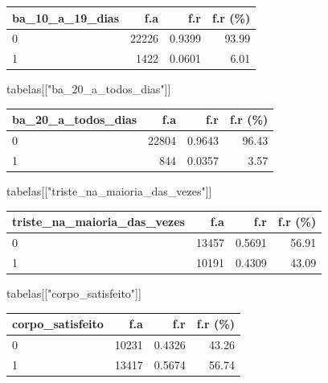 \documentclass[
]{article}
\newenvironment{Shaded}{\begin{snugshade}}{\end{snugshade}}
\newcommand{\NormalTok}[1]{\textcolor[rgb]{0.00,0.23,0.31}{#1}}
\newcommand{\StringTok}[1]{\textcolor[rgb]{0.13,0.47,0.30}{#1}}
\begin{document}
\begin{longtable}[]{@{}lrrr@{}}
\toprule()
ba\_10\_a\_19\_dias & f.a & f.r & f.r (\%) \\
\midrule()
\endhead
0 & 22226 & 0.9399 & 93.99 \\
1 & 1422 & 0.0601 & 6.01 \\
\bottomrule()
\end{longtable}

\begin{Shaded}
\begin{Highlighting}[]
\NormalTok{tabelas[[}\StringTok{"ba\_20\_a\_todos\_dias"}\NormalTok{]]}
\end{Highlighting}
\end{Shaded}

\begin{longtable}[]{@{}lrrr@{}}
\toprule()
ba\_20\_a\_todos\_dias & f.a & f.r & f.r (\%) \\
\midrule()
\endhead
0 & 22804 & 0.9643 & 96.43 \\
1 & 844 & 0.0357 & 3.57 \\
\bottomrule()
\end{longtable}

\begin{Shaded}
\begin{Highlighting}[]
\NormalTok{tabelas[[}\StringTok{"triste\_na\_maioria\_das\_vezes"}\NormalTok{]]}
\end{Highlighting}
\end{Shaded}

\begin{longtable}[]{@{}lrrr@{}}
\toprule()
triste\_na\_maioria\_das\_vezes & f.a & f.r & f.r (\%) \\
\midrule()
\endhead
0 & 13457 & 0.5691 & 56.91 \\
1 & 10191 & 0.4309 & 43.09 \\
\bottomrule()
\end{longtable}

\begin{Shaded}
\begin{Highlighting}[]
\NormalTok{tabelas[[}\StringTok{"corpo\_satisfeito"}\NormalTok{]]}
\end{Highlighting}
\end{Shaded}

\begin{longtable}[]{@{}lrrr@{}}
\toprule()
corpo\_satisfeito & f.a & f.r & f.r (\%) \\
\midrule()
\endhead
0 & 10231 & 0.4326 & 43.26 \\
1 & 13417 & 0.5674 & 56.74 \\
\bottomrule()
\end{longtable}
\end{document}
